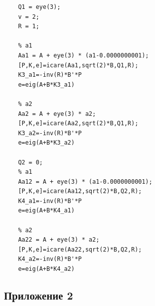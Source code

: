 \documentclass[a4paper, 12pt]{article}
\begin{document}
\begin{lstlisting}[label=task1code, caption={Программа для задания 1}]
    % solving Riccati
    Q1 = eye(3);
    v = 2;
    R = 1;

    % a1
    Aa1 = A + eye(3) * (a1-0.0000000001);
    [P,K,e]=icare(Aa1,sqrt(2)*B,Q1,R);
    K3_a1=-inv(R)*B'*P
    e=eig(A+B*K3_a1)

    % a2
    Aa2 = A + eye(3) * a2;
    [P,K,e]=icare(Aa2,sqrt(2)*B,Q1,R);
    K3_a2=-inv(R)*B'*P
    e=eig(A+B*K3_a2)

    Q2 = 0;
    % a1
    Aa12 = A + eye(3) * (a1-0.0000000001);
    [P,K,e]=icare(Aa12,sqrt(2)*B,Q2,R);
    K4_a1=-inv(R)*B'*P
    e=eig(A+B*K4_a1)

    % a2
    Aa22 = A + eye(3) * a2;
    [P,K,e]=icare(Aa22,sqrt(2)*B,Q2,R);
    K4_a2=-inv(R)*B'*P
    e=eig(A+B*K4_a2)
    \end{lstlisting}


    \subsection{Приложение 2}
\end{document}
